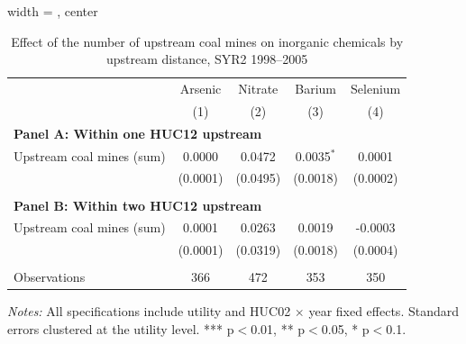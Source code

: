 \begin{table}[htbp]
   
   \caption{\label{tab:6yr_huc02fe_inorg_ravalli_2005_k2nmines} Effect of the number of upstream coal mines on inorganic chemicals by upstream distance, SYR2 1998--2005}
   \bigskip
   
   \centering
   
\begin{adjustbox}{width = \textwidth, center}
   \begin{tabular}{lcccc}
      \toprule
       & Arsenic & Nitrate & Barium & Selenium \\
                                & (1)      & (2)      & (3)          & (4)\\  
      \midrule 
      \multicolumn{5}{l}{\textbf{Panel A: Within one HUC12 upstream}} \\
      Upstream coal mines (sum) & 0.0000   & 0.0472   & 0.0035$^{*}$ & 0.0001\\   
                                & (0.0001) & (0.0495) & (0.0018)     & (0.0002)\\   
       \\
      \midrule 
      \multicolumn{5}{l}{\textbf{Panel B: Within two HUC12 upstream}} \\
      Upstream coal mines (sum) & 0.0001   & 0.0263   & 0.0019   & -0.0003\\   
                                & (0.0001) & (0.0319) & (0.0018) & (0.0004)\\   
       \\
      Observations              & 366      & 472      & 353      & 350\\  
      \bottomrule
   \end{tabular}
\end{adjustbox}
   
   {\tiny\linespread{1}\selectfont \par \raggedright 
   \textit{Notes:} All specifications include utility and HUC02 $\times$ year fixed effects. Standard errors clustered at the utility level. *** p$<$0.01, ** p$<$0.05, * p$<$0.1.}
   
\end{table}


